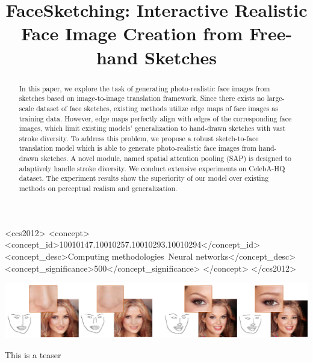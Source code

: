 \documentclass[sigconf,anonymous,review]{acmart}
\begin{document}
\title{FaceSketching: Interactive Realistic Face Image Creation from Free-hand Sketches }


\begin{abstract}
In this paper, we explore the task of generating photo-realistic face images from sketches based on image-to-image translation framework. 
Since there exists no large-scale dataset of face sketches, existing methods utilize edge maps of face images as training data. However, edge maps perfectly align with edges of the corresponding face images, which limit existing models' generalization to hand-drawn sketches with vast stroke diversity. 
To address this problem, we propose a robust sketch-to-face translation model which is able to generate photo-realistic face images from hand-drawn sketches. 
A novel module, named spatial attention pooling (SAP) is designed to adaptively handle stroke diversity.
We conduct extensive experiments on CelebA-HQ dataset. The experiment results show the superiority of our model over existing methods on perceptual realism and generalization.
\end{abstract}

%
\begin{CCSXML}
	<ccs2012>
	<concept>
	<concept_id>10010147.10010257.10010293.10010294</concept_id>
	<concept_desc>Computing methodologies~Neural networks</concept_desc>
	<concept_significance>500</concept_significance>
	</concept>
	</ccs2012>
\end{CCSXML}



%
%



\begin{teaserfigure}
	\includegraphics[width=\textwidth]{figs/teaser.png}
	\caption{This is a teaser}
	\label{fig:teaser}
\end{teaserfigure}


\maketitle







\balance 

%
\end{document}
